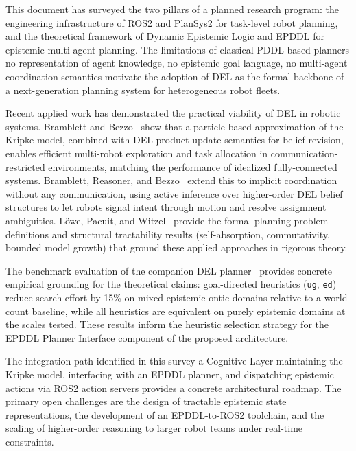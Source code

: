 \documentclass[12pt,a4paper]{article}
\theoremstyle{definition}
\theoremstyle{plain}
\begin{document}
This document has surveyed the two pillars of a planned research program: the engineering
infrastructure of ROS2 and PlanSys2 for task-level robot planning, and the theoretical
framework of Dynamic Epistemic Logic and EPDDL for epistemic multi-agent planning. The
limitations of classical PDDL-based planners no representation of agent knowledge,
no epistemic goal language, no multi-agent coordination semantics motivate the adoption
of DEL as the formal backbone of a next-generation planning system for heterogeneous robot
fleets.

Recent applied work has demonstrated the practical viability of DEL in robotic systems.
Bramblett and Bezzo~\cite{bramblett2023icra, bramblett2023frontiers} show that a
particle-based approximation of the Kripke model, combined with DEL product update
semantics for belief revision, enables efficient multi-robot exploration and task
allocation in communication-restricted environments, matching the performance of
idealized fully-connected systems. Bramblett, Reasoner, and Bezzo~\cite{bramblett2025active}
extend this to implicit coordination without any communication, using active inference
over higher-order DEL belief structures to let robots signal intent through motion and
resolve assignment ambiguities. L{\"o}we, Pacuit, and Witzel~\cite{lowe2010planning}
provide the formal planning problem definitions and structural tractability results
(self-absorption, commutativity, bounded model growth) that ground these applied
approaches in rigorous theory.

The benchmark evaluation of the companion DEL planner~\cite{ulises2026del} provides
concrete empirical grounding for the theoretical claims: goal-directed heuristics
(\texttt{ug}, \texttt{ed}) reduce search effort by 15\% on mixed epistemic-ontic
domains relative to a world-count baseline, while all heuristics are equivalent on
purely epistemic domains at the scales tested. These results inform the heuristic
selection strategy for the EPDDL Planner Interface component of the proposed architecture.

The integration path identified in this survey a Cognitive Layer maintaining the Kripke
model, interfacing with an EPDDL planner, and dispatching epistemic actions via ROS2
action servers provides a concrete architectural roadmap. The primary open challenges
are the design of tractable epistemic state representations, the development of an
EPDDL-to-ROS2 toolchain, and the scaling of higher-order reasoning to larger robot teams
under real-time constraints.
\end{document}
